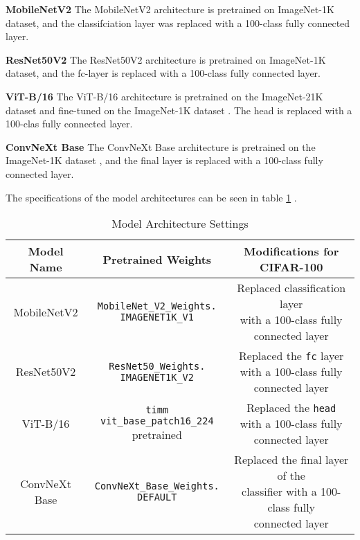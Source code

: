 \myindent \textbf{MobileNetV2} The MobileNetV2 architecture is pretrained on ImageNet-1K dataset, and the classifciation layer was replaced with a 100-class fully connected layer. 

\myindent \textbf{ResNet50V2} The ResNet50V2 architecture is pretrained on ImageNet-1K dataset, and the fc-layer is replaced with a 100-class fully connected layer. 

\myindent \textbf{ViT-B/16} The ViT-B/16 architecture is pretrained on the ImageNet-21K dataset and fine-tuned on the ImageNet-1K dataset \cite{huggingface2024vitbase}. The head is replaced with a 100-clas fully connected layer.

\myindent \textbf{ConvNeXt Base} The ConvNeXt Base architecture is pretrained on the ImageNet-1K dataset \cite{torchvision2024convnextbase}, and the final layer is replaced with a 100-class fully connected layer.

The specifications of the model architectures can be seen in table \ref{tab:model_settings} .

\begin{table}[h]
    \centering
    \caption{Model Architecture Settings}
    \begin{tabular}{|c|c|c|}
    \hline
    \textbf{Model Name}   & \textbf{Pretrained Weights}            & \textbf{Modifications for CIFAR-100}                     \\ \hline
    MobileNetV2           & \makecell[l]{\texttt{MobileNet\_V2\_Weights.} \\ \texttt{IMAGENET1K\_V1}} 
                          & \makecell[l]{Replaced classification layer \\ with a 100-class fully connected layer} \\ \hline
    ResNet50V2            & \makecell[l]{\texttt{ResNet50\_Weights.} \\ \texttt{IMAGENET1K\_V2}} 
                          & \makecell[l]{Replaced the \texttt{fc} layer \\ with a 100-class fully connected layer} \\ \hline
    ViT-B/16              & \makecell[l]{\texttt{timm vit\_base\_patch16\_224} \\ pretrained} 
                          & \makecell[l]{Replaced the \texttt{head} \\ with a 100-class fully connected layer} \\ \hline
    ConvNeXt Base         & \makecell[l]{\texttt{ConvNeXt\_Base\_Weights.} \\ \texttt{DEFAULT}} 
                          & \makecell[l]{Replaced the final layer of the \\ classifier with a 100-class fully \\ connected layer} \\ \hline
    \end{tabular}
    \label{tab:model_settings}
\end{table}


